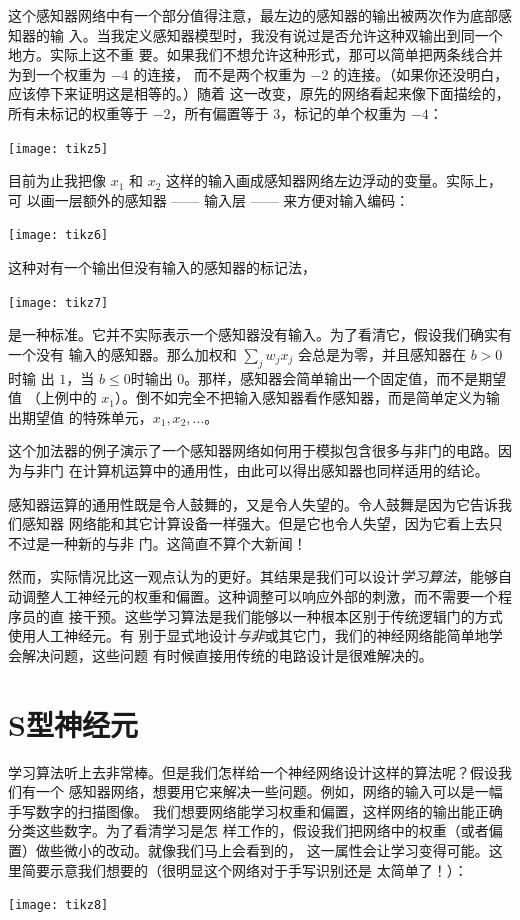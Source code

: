 这个感知器网络中有一个部分值得注意，最左边的感知器的输出被两次作为底部感知器的输
入。当我定义感知器模型时，我没有说过是否允许这种双输出到同一个地方。实际上这不重
要。如果我们不想允许这种形式，那可以简单把两条线合并为到一个权重为 $-4$ 的连接，
而不是两个权重为 $-2$ 的连接。（如果你还没明白，应该停下来证明这是相等的。）随着
这一改变，原先的网络看起来像下面描绘的，所有未标记的权重等于 $-2$，所有偏置等于
$3$，标记的单个权重为 $-4$：
\begin{center}
  \texttt{[image: tikz5]}
\end{center}

目前为止我把像 $x_1$ 和 $x_2$ 这样的输入画成感知器网络左边浮动的变量。实际上，可
以画一层额外的感知器 —— 输入层 —— 来方便对输入编码：
\begin{center}
  \texttt{[image: tikz6]}
\end{center}

这种对有一个输出但没有输入的感知器的标记法，
\begin{center}
  \texttt{[image: tikz7]}
\end{center}
是一种标准。它并不实际表示一个感知器没有输入。为了看清它，假设我们确实有一个没有
输入的感知器。那么加权和 $\sum_j w_j x_j$ 会总是为零，并且感知器在 $b > 0$ 时输
出 $1$，当 $b \leq 0$时输出 $0$。那样，感知器会简单输出一个固定值，而不是期望值
（上例中的 $x_1$）。倒不如完全不把输入感知器看作感知器，而是简单定义为输出期望值
的特殊单元，$x_1, x_2,\ldots$。

这个加法器的例子演示了一个感知器网络如何用于模拟包含很多与非门的电路。因为与非门
在计算机运算中的通用性，由此可以得出感知器也同样适用的结论。

感知器运算的通用性既是令人鼓舞的，又是令人失望的。令人鼓舞是因为它告诉我们感知器
网络能和其它计算设备一样强大。但是它也令人失望，因为它看上去只不过是一种新的与非
门。这简直不算个大新闻！

然而，实际情况比这一观点认为的更好。其结果是我们可以设计\emph{学习算法}，能够自
动调整人工神经元的权重和偏置。这种调整可以响应外部的刺激，而不需要一个程序员的直
接干预。这些学习算法是我们能够以一种根本区别于传统逻辑门的方式使用人工神经元。有
别于显式地设计\emph{与非}或其它门，我们的神经网络能简单地学会解决问题，这些问题
有时候直接用传统的电路设计是很难解决的。

\section{S型神经元}
\label{seq:sigmoid_neurons}

学习算法听上去非常棒。但是我们怎样给一个神经网络设计这样的算法呢？假设我们有一个
感知器网络，想要用它来解决一些问题。例如，网络的输入可以是一幅手写数字的扫描图像。
我们想要网络能学习权重和偏置，这样网络的输出能正确分类这些数字。为了看清学习是怎
样工作的，假设我们把网络中的权重（或者偏置）做些微小的改动。就像我们马上会看到的，
这一属性会让学习变得可能。这里简要示意我们想要的（很明显这个网络对于手写识别还是
  太简单了！）：
\begin{center}
  \texttt{[image: tikz8]}  
\end{center}

